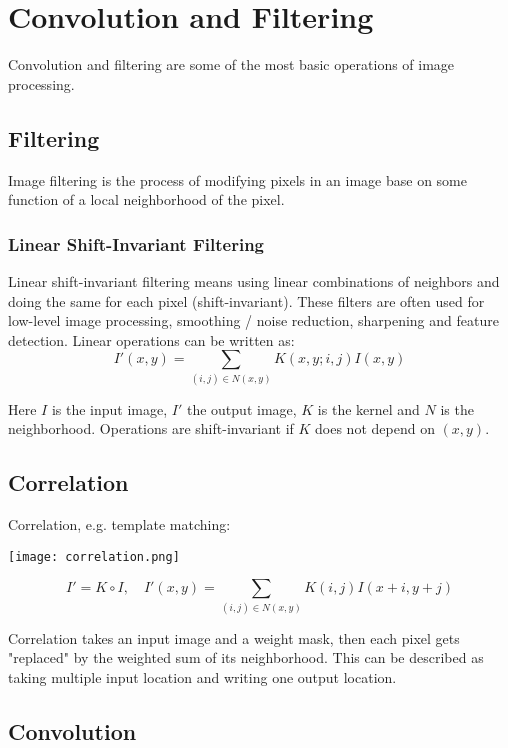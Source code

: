 \section{Convolution and Filtering}

Convolution and filtering are some of the most basic operations of image processing. 


\subsection{Filtering}

Image filtering is the process of modifying pixels in an image base on some function of a local neighborhood of the pixel.

\subsubsection{Linear Shift-Invariant Filtering}

Linear shift-invariant filtering means using linear combinations of neighbors and doing the same for each pixel (shift-invariant). These filters are often used for low-level image processing, smoothing / noise reduction, sharpening and feature detection. Linear operations can be written as:
$$I'(x,y) = \sum_{(i,j) \in N(x,y)} K(x,y; i, j) I(x,y)$$

Here $I$ is the input image, $I'$ the output image, $K$ is the kernel and $N$ is the neighborhood. Operations are shift-invariant if $K$ does not depend on $(x,y)$.


\subsection{Correlation}

Correlation, e.g. template matching:

\begin{center}
	\texttt{[image: correlation.png]}
\end{center}
$$I' = K \circ I, \quad I'(x,y) = \sum_{(i,j) \in N(x,y)} K(i, j) I(x + i, y + j)$$

Correlation takes an input image and a weight mask, then each pixel gets "replaced" by the weighted sum of its neighborhood. This can be described as taking multiple input location and writing one output location.


\subsection{Convolution}

